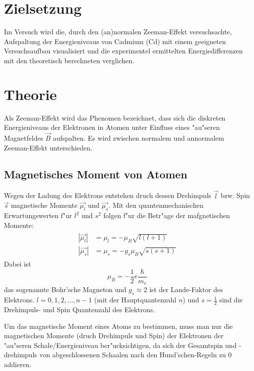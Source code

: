 \section{Zielsetzung}
  Im Versuch wird die, durch den (an)normalen Zeeman-Effekt versuchsachte, Aufspaltung der Energieniveaus von Cadmium (Cd) mit einem geeigneten Versuchsaufbau visualisiert und die experimentel ermittelten Energiedifferenzen mit den theoretisch berechneten verglichen.


\section{Theorie}
\label{sec:Theorie}
  Als Zeeman-Effekt wird das Phenomen bezeichnet, dass sich die diskreten Energieniveaus der Elektronen in Atomen unter Einfluss eines "au"seren Magnetfeldes $\vec{B}$ aufspalten.
  Es wird zwischen normalem und annormalem Zeeman-Effekt unterschieden.


  \subsection{Magnetisches Moment von Atomen}
    Wegen der Ladung des Elektrons entstehen druch dessen Drehimpuls $\vec{l}$ bzw. Spin $\vec{s}$ magnetische Momente $\vec{\mu_l}$ und $\vec{\mu_s}$.
    Mit den quantenmechanischen Erwartungswerten f"ur $l^2$ und $s^2$ folgen f"ur die Betr"age der mafgnetischen Momente:
    \begin{align}
      \begin{split}
        |\vec{\mu_l}| &= \mu_l = -\mu_B\sqrt{l(l+1)} \\
        |\vec{\mu_s}| &= \mu_s = -g_s\mu_B\sqrt{s(s+1)}
      \end{split}
    \end{align}
    Dabei ist
    \begin{equation}
      \mu_B = -\frac{1}{2}e\frac{\hbar}{m_e}
    \end{equation}
    das sogenannte Bohr'sche Magneton und $g_s \approx 2$ ist der Lande-Faktor des Elektrons.
    $l = 0,1,2,...,n-1$ (mit der Hauptquantenzahl $n$) und $s=\frac{1}{2}$ sind die Drehimpuls- und Spin Quantenzahl des Elektrons.

    Um das magnetische Moment eines Atoms zu bestimmen, muss man nur die magnetischen Momente (druch Drehimpuls und Spin) der Elektronen der "au"seren Schale/Energieniveau ber"ucksichtigen, da sich der Gesamtspin und -drehimpuls von abgeschlossenen Schaalen nach den Hund'schen-Regeln zu 0 addieren.

